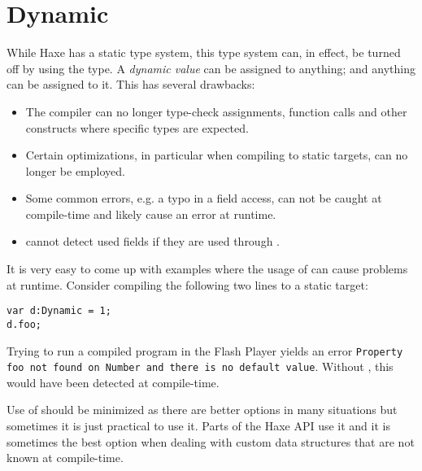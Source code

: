 \section{Dynamic}
\label{types-dynamic}

While Haxe has a static type system, this type system can, in effect, be turned off by using the  type. A \emph{dynamic value} can be assigned to anything; and anything can be assigned to it. This has several drawbacks:

\begin{itemize}
	\item The compiler can no longer type-check assignments, function calls and other constructs where specific types are expected.
	\item Certain optimizations, in particular when compiling to static targets, can no longer be employed.
	\item Some common errors, e.g. a typo in a field access, can not be caught at compile-time and likely cause an error at runtime.
	\item {} cannot detect used fields if they are used through .
\end{itemize}
It is very easy to come up with examples where the usage of  can cause problems at runtime. Consider compiling the following two lines to a static target:

\begin{lstlisting}
var d:Dynamic = 1;
d.foo;
\end{lstlisting}

Trying to run a compiled program in the Flash Player yields an error \texttt{Property foo not found on Number and there is no default value}. Without , this would have been detected at compile-time.


Use of  should be minimized as there are better options in many situations but sometimes it is just practical to use it. Parts of the Haxe  API use it and it is sometimes the best option when dealing with custom data structures that are not known at compile-time.

